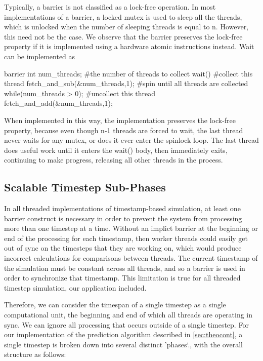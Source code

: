 \documentclass[conference]{IEEEtran}
\begin{document}
Typically, a barrier is not classified as a lock-free operation.  In most implementations of a barrier, a locked mutex is used to sleep all the threads, which is 
unlocked when the number of sleeping threads is equal to n.  However, this need not be the case.  We observe that the barrier preserves the lock-free property if it is implemented
using a hardware atomic instructions instead.  Wait can be implemented as 

\begin{verbatimtab}[3]
barrier{
int num_threads; #the number of threads to collect
wait()
    #collect this thread
    fetch_and_sub(&num_threads,1);
    #spin until all threads are collected
    while(num_threads > 0);
    #uncollect this thread
    fetch_and_add(&num_threads,1);
}
\end{verbatimtab}

When implemented in this way, the implementation preserves the lock-free property, because even though n-1 threads are forced to wait, the last thread never waits for any 
mutex, or does it ever enter the spinlock loop.  The last thread does useful work until it enters the wait() body, then immediately exits, continuing to make progress, releasing all
other threads in the process.

\subsection{Scalable Timestep Sub-Phases}
\label{sec:stsp}
In all threaded implementations of timestamp-based simulation, at least one barrier construct
is necessary in order to prevent the system from processing more than one timestep at a time.  Without an implict barrier at the beginning or end of the 
processing for each timestamp, then worker threads could easily get out of sync on the timesteps that they are working on, which would produce incorrect calculations
for comparisons between threads.  The current timestamp of the simulation must be constant across all threads, and so a barrier is used in order to synchronize that timestamp.  This
limitation is true for all threaded timestep simulation, our application included.

Therefore, we can consider the timespan of a single timestep as a single computational unit, the beginning and end of which all threads are operating in sync.  We can ignore
all processing that occurs outside of a single timestep.  For our implementation of the prediction algorithm described in \ref{sec:theocont}, a single timestep is broken down
into several distinct 'phases`., with the overall structure as follows:
\end{document}
